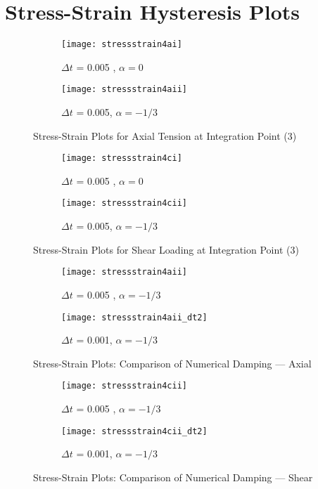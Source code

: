 \section*{Stress-Strain Hysteresis Plots}
\begin{figure}[htbp]
\centering
\begin{subfigure}{.5\textwidth}
  \centering
  \texttt{[image: stressstrain4ai]}
  \caption{$\Delta t$ = 0.005 , $\alpha = 0$}
  \label{fig:sub1}
\end{subfigure}%
\begin{subfigure}{.5\textwidth}
  \centering
  \texttt{[image: stressstrain4aii]}
  \caption{$\Delta t$ = 0.005, $\alpha = -1/3$}
  \label{fig:sub2}
\end{subfigure}
\caption{ Stress-Strain Plots for Axial Tension at Integration Point (3) }
\label{Stress-Shear}
\end{figure}
\begin{figure}[htbp]
\centering
\begin{subfigure}{.5\textwidth}
  \centering
  \texttt{[image: stressstrain4ci]}
  \caption{$\Delta t$ = 0.005 , $\alpha = 0$}
  \label{fig:sub1}
\end{subfigure}%
\begin{subfigure}{.5\textwidth}
  \centering
  \texttt{[image: stressstrain4cii]}
  \caption{$\Delta t$ = 0.005, $\alpha = -1/3$}
  \label{fig:sub2}
\end{subfigure}
\caption{ Stress-Strain Plots for Shear Loading at Integration Point (3) }
\label{Stress-Shear}
\end{figure}
\begin{figure}[htbp]
\centering
\begin{subfigure}{.5\textwidth}
  \centering
  \texttt{[image: stressstrain4aii]}
  \caption{$\Delta t$ = 0.005 , $\alpha = -1/3$}
  \label{fig:sub1}
\end{subfigure}%
\begin{subfigure}{.5\textwidth}
  \centering
  \texttt{[image: stressstrain4aii\_dt2]}
  \caption{$\Delta t$ = 0.001, $\alpha = -1/3$}
  \label{fig:sub2}
\end{subfigure}
\caption{ Stress-Strain Plots: Comparison of Numerical Damping --- Axial }
\end{figure}
\begin{figure}[htbp]
\centering
\begin{subfigure}{.5\textwidth}
  \centering
  \texttt{[image: stressstrain4cii]}
  \caption{$\Delta t$ = 0.005 , $\alpha = -1/3$}
  \label{fig:sub1}
\end{subfigure}%
\begin{subfigure}{.5\textwidth}
  \centering
  \texttt{[image: stressstrain4cii\_dt2]}
  \caption{$\Delta t$ = 0.001, $\alpha = -1/3$}
  \label{fig:sub2}
\end{subfigure}
\caption{ Stress-Strain Plots: Comparison of Numerical Damping --- Shear }
\end{figure}
